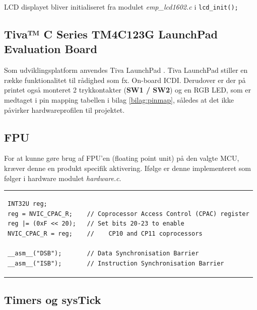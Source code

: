 LCD displayet bliver initialiseret fra modulet \textit{emp\_lcd1602.c} i  \texttt{lcd\_init();}
  
\FloatBlock

\subsection{Tiva™ C Series TM4C123G LaunchPad Evaluation Board}
Som udviklingsplatform anvendes Tiva LaunchPad \cite{spmu296}. 
Tiva LaunchPad stiller en række funktionalitet til rådighed som fx. On-board ICDI.
Derudover er der på printet også monteret 2 trykkontakter (\textbf{SW1 / SW2}) og en RGB LED, som er medtaget i pin mapping tabellen i bilag \ref{bilag:pinmap}, således at det ikke påvirker hardwareprofilen til projektet.   

\subsection{FPU}
For at kunne gøre brug af FPU'en (floating point unit) på den valgte MCU, kræver denne en produkt specifik aktivering.
Ifølge \cite[afsnit 3.1.5.7 s. 132]{tm4c123gh6pm} er denne implementeret som følger i hardware modulet \textit{hardware.c}.

\begin{tabular}{l}
\begin{lstlisting}[title=init\_FPU()]
INT32U reg;
reg = NVIC_CPAC_R;    // Coprocessor Access Control (CPAC) register
reg |= (0xF << 20);   // Set bits 20-23 to enable 
NVIC_CPAC_R = reg;    // 	CP10 and CP11 coprocessors

__asm__("DSB");       // Data Synchronisation Barrier
__asm__("ISB");       // Instruction Synchronisation Barrier
\end{lstlisting}
\end{tabular}

\subsection{Timers og sysTick}

 